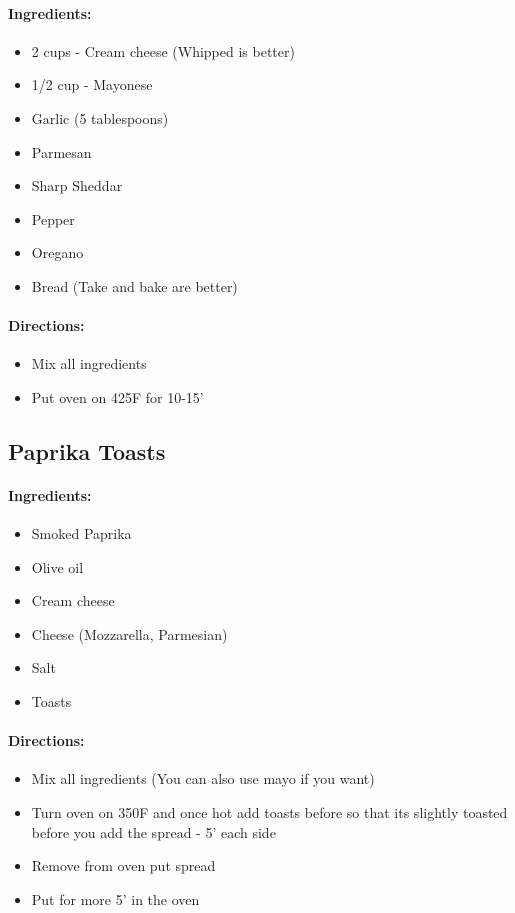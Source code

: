 \documentclass{article}
\begin{document}
\paragraph{Ingredients:}

\begin{itemize}
	\item 2 cups - Cream cheese (Whipped is better)
	\item 1/2 cup - Mayonese 
	\item Garlic (5 tablespoons)
	\item Parmesan
	\item Sharp Sheddar
	\item Pepper
	\item Oregano
	\item Bread (Take and bake are better)
\end{itemize}

\paragraph{Directions:}
\begin{itemize}
	\item Mix all ingredients
	\item Put oven on 425F for 10-15'
\end{itemize}

\subsection{Paprika Toasts}

\paragraph{Ingredients:}

\begin{itemize}
	\item Smoked Paprika
	\item Olive oil
	\item Cream cheese
	\item Cheese (Mozzarella, Parmesian)
	\item Salt
	\item Toasts
\end{itemize}

\paragraph{Directions:}
\begin{itemize}
	\item Mix all ingredients (You can also use mayo if you want)
	\item Turn oven on 350F and once hot add toasts before so that its slightly toasted before you add the spread - 5' each side
	\item Remove from oven put spread
	\item Put for more 5' in the oven
\end{itemize}
\end{document}
